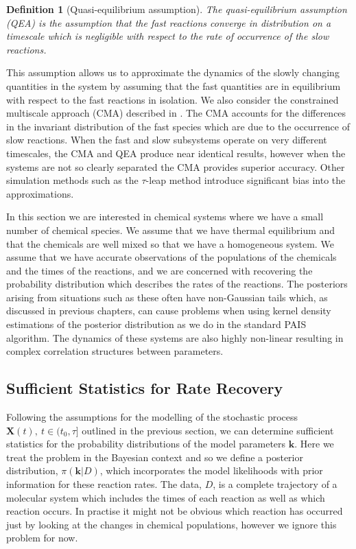\documentclass[final]{siamltex}
\newtheorem{dfn}{Definition}[section]
\begin{document}
\begin{dfn}[Quasi-equilibrium assumption]
	The quasi-equilibrium assumption (QEA) is the assumption that the fast reactions converge in distribution on a timescale which is negligible with respect to the rate of occurrence of the slow reactions.
\end{dfn}

This assumption allows us to approximate the dynamics of the slowly changing quantities in the system by assuming that the fast quantities are in equilibrium with respect to the fast reactions in isolation. We also consider the constrained multiscale approach (CMA) described in \cite{cotter2011constrained,cotter2016constrained}. The CMA accounts for the differences in the invariant distribution of the fast species which are due to the occurrence of slow reactions. When the fast and slow subsystems operate on very different timescales, the CMA and QEA produce near identical results, however when the systems are not so clearly separated the CMA provides superior accuracy. Other simulation methods such as the $\tau$-leap method introduce significant bias into the approximations.

In this section we are interested in chemical systems where we have a small number of chemical species. We assume that we have thermal equilibrium and that the chemicals are well mixed so that we have a homogeneous system. We assume that we have accurate observations of the populations of the chemicals and the times of the reactions, and we are concerned with recovering the probability distribution which describes the rates of the reactions. The posteriors arising from situations such as these often have non-Gaussian tails which, as discussed in previous chapters, can cause problems when using kernel density estimations of the posterior distribution as we do in the standard PAIS algorithm. The dynamics of these systems are also highly non-linear resulting in complex correlation structures between parameters.


\subsection{Sufficient Statistics for Rate Recovery}

Following the assumptions for the modelling of the stochastic process $\mathbf{X}(t),\ t \in (t_0, \tau]$ outlined in the previous section, we can determine sufficient statistics for the probability distributions of the model parameters $\mathbf{k}$. Here we treat the problem in the Bayesian context and so we define a posterior distribution, $\pi(\mathbf{k}|D)$, which incorporates the model likelihoods with prior information for these reaction rates. The data, $D$, is a complete trajectory of a molecular system which includes the times of each reaction as well as which reaction occurs. In practise it might not be obvious which reaction has occurred just by looking at the changes in chemical populations, however we ignore this problem for now.
\end{document}

